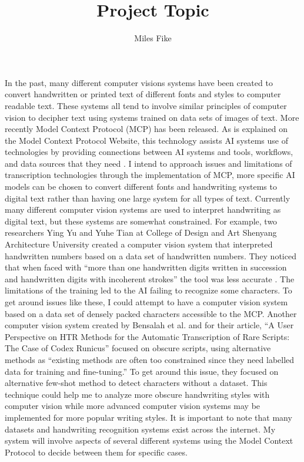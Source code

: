 \documentclass[12pt]{article}
\title{\textbf{Project Topic}}
\author{Miles Fike}
\begin{document}
\maketitle

In the past, many different computer visions systems have been created to convert handwritten or printed text of different fonts and styles to computer readable text. These systems all tend to involve similar principles of computer vision to decipher text using systems trained on data sets of images of text. More recently Model Context Protocol (MCP) has been released. As is explained on the Model Context Protocol Website, this technology assists AI systems use of technologies by providing connections between AI systems and tools, workflows, and data sources that they need \cite{modelContextProtocol/getting-started/intro}. I intend to approach issues and limitations of transcription technologies through the implementation of MCP, more specific AI models can be chosen to convert different fonts and handwriting systems to digital text rather than having one large system for all types of text. 
\newline
Currently many different computer vision systems are used to interpret handwriting as digital text, but these systems are somewhat constrained.  For example, two researchers Ying Yu and Yuhe Tian at College of Design and Art Shenyang Architecture University created a computer vision system that interpreted handwritten numbers based on a data set of handwritten numbers. They noticed that when faced with “more than one handwritten digits written in succession and handwritten digits with incoherent strokes” the tool was less accurate \cite{10.1145/3727648.3727679}. The limitations of the training led to the AI failing to recognize some characters. To get around issues like these, I could attempt to have a computer vision system based on a data set of densely packed characters accessible to the MCP. Another computer vision system created by Bensalah et al. and for their article, “A User Perspective on HTR Methods for the Automatic Transcription of Rare Scripts: The Case of Codex Runicus” focused on obscure scripts, using alternative methods as “existing methods are often too constrained since they need labelled data for training and fine-tuning.” \cite{10.1145/3519306}  To get around this issue, they focused on alternative few-shot method to detect characters without a dataset. This technique could help me to analyze more obscure handwriting styles with computer vision while more advanced computer vision systems may be implemented for more popular writing styles. It is important to note that many datasets and handwriting recognition systems exist across the internet. My system will involve aspects of several different systems using the Model Context Protocol to decide between them for specific cases.
\end{document}
